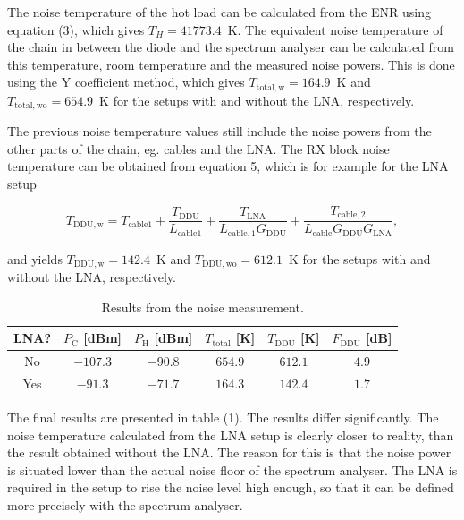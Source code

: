 \documentclass[a4paper, 12pt]{article}
\begin{document}
The noise temperature of the hot load can be calculated from the ENR using equation (3), which gives $T_H = 41773.4$~K. The equivalent noise temperature of the chain in between the diode and the spectrum analyser can be calculated from this temperature, room temperature and the measured noise powers. This is done using the Y coefficient method, which gives $T_{\mathrm{total, w}} = 164.9$~K and $T_{\mathrm{total, wo}} = 654.9$~K for the setups with and without the LNA, respectively.

The previous noise temperature values still include the noise powers from the other parts of the chain, eg. cables and the LNA. The RX block noise temperature can be obtained from equation 5, which is for example for the LNA setup

\begin{equation}
T_\mathrm{DDU, w} = T_\mathrm{cable 1} + \frac{T_\mathrm{DDU}}{L_\mathrm{cable 1}} + \frac{T_\mathrm{LNA}}{L_\mathrm{cable, 1} G_\mathrm{DDU}} + \frac{T_\mathrm{cable, 2}}{L_\mathrm{cable} G_\mathrm{DDU} G_\mathrm{LNA}},
\end{equation}

\noindent
and yields $T_{\mathrm{DDU, w}} = 142.4$~K and $T_{\mathrm{DDU, wo}} = 612.1$~K for the setups with and without the LNA, respectively.

\begin{table}[!h]
	\begin{center}
	\caption{Results from the noise measurement.}
	\label{t:noise}
	\renewcommand*{\arraystretch}{1.2}
	\begin{tabular}{cccccc}
	LNA? 			& $P_\mathrm{C}$ [dBm] 		& $P_\mathrm{H}$ [dBm]	& $T_\mathrm{total}$ [K] 	& $T_\mathrm{DDU}$ [K] 	& $F_\mathrm{DDU}$ [dB] \\
	\hline
	No				& $-107.3$					& $-90.8$				& $654.9$ 							& $612.1$ 						& $4.9$\\
	Yes				& $-91.3$					& $-71.7$				& $164.3$ 							& $142.4$ 						& $1.7$ 	
	\end{tabular}
	\end{center}
	\vspace*{-12pt}
\end{table}

\noindent
The final results are presented in table (1). The results differ significantly. The noise temperature calculated from the LNA setup is clearly closer to reality, than the result obtained without the LNA. The reason for this is that the noise power is situated lower than the actual noise floor of the spectrum analyser. The LNA is required in the setup to rise the noise level high enough, so that it can be defined more precisely with the spectrum analyser.
\end{document}
